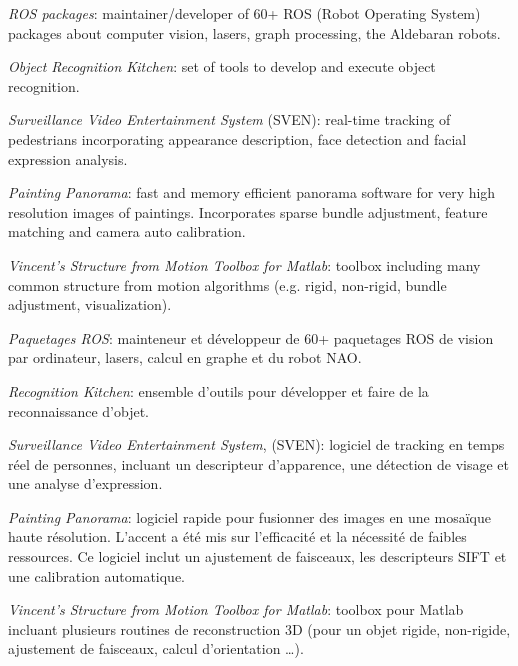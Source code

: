 \documentclass{article}
\begin{document}
\begin{llist}
{
{\em ROS packages}: maintainer/developer of 60+ ROS (Robot Operating System) packages about computer vision, lasers, 
graph processing, the Aldebaran robots.

{\em Object Recognition Kitchen}: set of tools to develop and execute object recognition.

{\em Surveillance Video Entertainment System} (SVEN): real-time tracking of pedestrians incorporating appearance 
description, face detection and facial expression analysis.

{\em Painting Panorama}: fast and memory efficient panorama software for very high resolution images of paintings. 
Incorporates sparse bundle adjustment, feature matching and camera auto calibration.

{\em Vincent's Structure from Motion Toolbox for Matlab}: toolbox including many common structure from motion algorithms 
(e.g. rigid, non-rigid, bundle adjustment, visualization).
}
{
{\em Paquetages ROS}: mainteneur et d\'{e}veloppeur de 60+ paquetages ROS de vision par ordinateur, lasers, calcul
en graphe et du robot NAO.

{\em Recognition Kitchen}: ensemble d'outils pour d\'{e}velopper et faire de la reconnaissance d'objet.

{\em Surveillance Video Entertainment System}, (SVEN): logiciel de tracking en temps r\'eel de personnes, incluant un 
descripteur d'apparence, une d\'{e}tection de visage et une analyse d'expression.

{\em Painting Panorama}: logiciel rapide pour fusionner des images en une mosa\"{i}que haute r\'{e}solution.  L'accent 
a \'{e}t\'{e} mis sur l'efficacit\'{e} et la n\'{e}cessit\'{e} de faibles ressources.  Ce logiciel inclut un ajustement 
de faisceaux, les descripteurs SIFT et une calibration automatique.

{\em Vincent's Structure from Motion Toolbox for Matlab}: toolbox pour Matlab incluant plusieurs routines de 
reconstruction 3D (pour un objet rigide, non-rigide, ajustement de faisceaux, calcul d'orientation \dots).
}

{
}
{
}


{
}
{
}



\end{llist}
\end{document}
